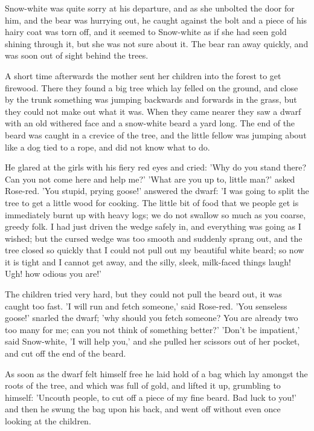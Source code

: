 \documentclass[12pt]{book}
\begin{document}
Snow-white was quite sorry at his departure, and as she unbolted the
door for him, and the bear was hurrying out, he caught against the
bolt and a piece of his hairy coat was torn off, and it seemed to
Snow-white as if she had seen gold shining through it, but she was not
sure about it. The bear ran away quickly, and was soon out of sight
behind the trees.

A short time afterwards the mother sent her children into the forest
to get firewood. There they found a big tree which lay felled on the
ground, and close by the trunk something was jumping backwards and
forwards in the grass, but they could not make out what it was. When
they came nearer they saw a dwarf with an old withered face and a
snow-white beard a yard long. The end of the beard was caught in a
crevice of the tree, and the little fellow was jumping about like a
dog tied to a rope, and did not know what to do.

He glared at the girls with his fiery red eyes and cried: 'Why do you
stand there? Can you not come here and help me?' 'What are you up to,
little man?' asked Rose-red. 'You stupid, prying goose!' answered the
dwarf: 'I was going to split the tree to get a little wood for
cooking. The little bit of food that we people get is immediately
burnt up with heavy logs; we do not swallow so much as you coarse,
greedy folk. I had just driven the wedge safely in, and everything was
going as I wished; but the cursed wedge was too smooth and suddenly
sprang out, and the tree closed so quickly that I could not pull out
my beautiful white beard; so now it is tight and I cannot get away,
and the silly, sleek, milk-faced things laugh! Ugh! how odious you
are!'

The children tried very hard, but they could not pull the beard out,
it was caught too fast. 'I will run and fetch someone,' said Rose-red.
'You senseless goose!' snarled the dwarf; 'why should you fetch
someone? You are already two too many for me; can you not think of
something better?' 'Don't be impatient,' said Snow-white, 'I will help
you,' and she pulled her scissors out of her pocket, and cut off the
end of the beard.

As soon as the dwarf felt himself free he laid hold of a bag which lay
amongst the roots of the tree, and which was full of gold, and lifted
it up, grumbling to himself: 'Uncouth people, to cut off a piece of my
fine beard. Bad luck to you!' and then he swung the bag upon his back,
and went off without even once looking at the children.
\end{document}

